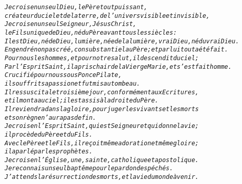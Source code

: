 \documentclass[RG2023_CarnetCommun.tex]{subfiles}
\begin{document}


\begin{alltt}\normalfont
\emph{Je crois en un seul Dieu, le Père tout puissant,
	créateur du ciel et de la terre, de l’univers visible et invisible,
Je crois en un seul Seigneur, Jésus Christ,
	le Fils unique de Dieu, né du Père avant tous les siècles :
Il est Dieu, né de Dieu, lumière, née de la lumière, vrai Dieu, né du vrai Dieu.
Engendré non pas créé, consubstantiel au Père ; et par lui tout a été fait.
Pour nous les hommes, et pour notre salut, il descendit du ciel;
Par l’Esprit Saint, il a pris chair de la Vierge Marie, et s’est fait homme.
Crucifié pour nous sous Ponce Pilate, 
	il souffrit sa passion et fut mis au tombeau.
Il ressuscita le troisième jour, conformément aux Ecritures,
	et il monta au ciel; il est assis à la droite du Père.
Il reviendra dans la gloire, pour juger les vivants et les morts
	et son règne n’aura pas de fin.
Je crois en l’Esprit Saint, qui est Seigneur et qui donne la vie;
	il procède du Père et du Fils.
Avec le Père et le Fils, il reçoit même adoration et même gloire;
	il a parlé par les prophètes.
Je crois en l’Église, une, sainte, catholique et apostolique.
Je reconnais un seul baptême pour le pardon des péchés.
J’attends la résurrection des morts, et la vie du monde à venir.}
\end{alltt}




\end{document}
